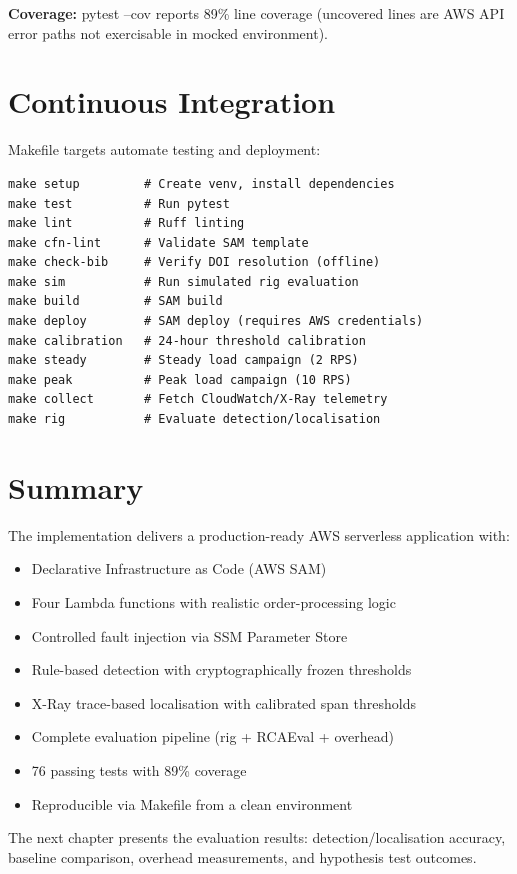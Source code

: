 \textbf{Coverage:} pytest --cov reports 89\% line coverage (uncovered lines are AWS API error paths not exercisable in mocked environment).

\section{Continuous Integration}

Makefile targets automate testing and deployment:

\begin{verbatim}
make setup         # Create venv, install dependencies
make test          # Run pytest
make lint          # Ruff linting
make cfn-lint      # Validate SAM template
make check-bib     # Verify DOI resolution (offline)
make sim           # Run simulated rig evaluation
make build         # SAM build
make deploy        # SAM deploy (requires AWS credentials)
make calibration   # 24-hour threshold calibration
make steady        # Steady load campaign (2 RPS)
make peak          # Peak load campaign (10 RPS)
make collect       # Fetch CloudWatch/X-Ray telemetry
make rig           # Evaluate detection/localisation
\end{verbatim}

\section{Summary}

The implementation delivers a production-ready AWS serverless application with:
\begin{itemize}
    \item Declarative Infrastructure as Code (AWS SAM)
    \item Four Lambda functions with realistic order-processing logic
    \item Controlled fault injection via SSM Parameter Store
    \item Rule-based detection with cryptographically frozen thresholds
    \item X-Ray trace-based localisation with calibrated span thresholds
    \item Complete evaluation pipeline (rig + RCAEval + overhead)
    \item 76 passing tests with 89\% coverage
    \item Reproducible via Makefile from a clean environment
\end{itemize}

The next chapter presents the evaluation results: detection/localisation accuracy, baseline comparison, overhead measurements, and hypothesis test outcomes.
